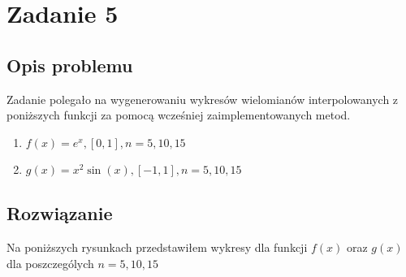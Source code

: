 \section{Zadanie 5}
\subsection{Opis problemu}
Zadanie polegało na wygenerowaniu wykresów wielomianów interpolowanych z poniższych funkcji za pomocą wcześniej zaimplementowanych metod.
\begin{enumerate}
  \item $f(x) = e^x, [0, 1], n = 5, 10, 15$
  \item $g(x) = x^2 \sin(x), [-1, 1], n = 5, 10, 15$
\end{enumerate} 
\subsection{Rozwiązanie}
Na poniższych rysunkach przedstawiłem wykresy dla funkcji $f(x)$ oraz $g(x)$ dla poszczególych $n = 5, 10, 15$ 
